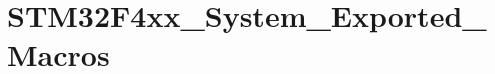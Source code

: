 \hypertarget{group___s_t_m32_f4xx___system___exported___macros}{}\section{S\+T\+M32\+F4xx\+\_\+\+System\+\_\+\+Exported\+\_\+\+Macros}
\label{group___s_t_m32_f4xx___system___exported___macros}
